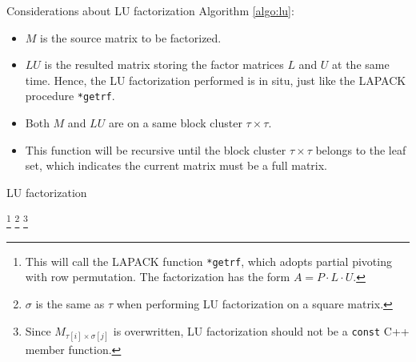\documentclass[11pt, a4paper]{article}
\begin{document}
Considerations about LU factorization Algorithm \ref{algo:lu}:
\begin{itemize}
\item $M$ is the source matrix to be factorized.
\item $LU$ is the resulted matrix storing the factor matrices $L$ and $U$ at the same time. Hence, the LU factorization performed is in situ, just like the LAPACK procedure \texttt{*getrf}.
\item Both $M$ and $LU$ are on a same block cluster $\tau\times\tau$.
\item This function will be recursive until the block cluster $\tau\times\tau$ belongs to the leaf set, which indicates the current matrix must be a full matrix.
\end{itemize}

\begin{breakablealgorithm}
  \label{algo:lu}
  \caption{LU factorization}
  \begin{algorithmic}[1]
         \footnote{This will call
the LAPACK function \texttt{*getrf}, which adopts partial pivoting with row permutation. The
factorization has the form $A = P \cdot L \cdot U$.}
      \Else
           \footnote{$\sigma$ is the
 same as $\tau$ when performing LU factorization on a square matrix.}
             \footnote{Since $M_{\tau[i]\times\sigma[j]}$ is overwritten, LU factorization should not
 be a \texttt{const} C++ member function.}
            \EndFor

            \EndIf
          \EndFor
        \EndFor
      \EndIf
    \EndProcedure
  \end{algorithmic}
\end{breakablealgorithm}
\end{document}
